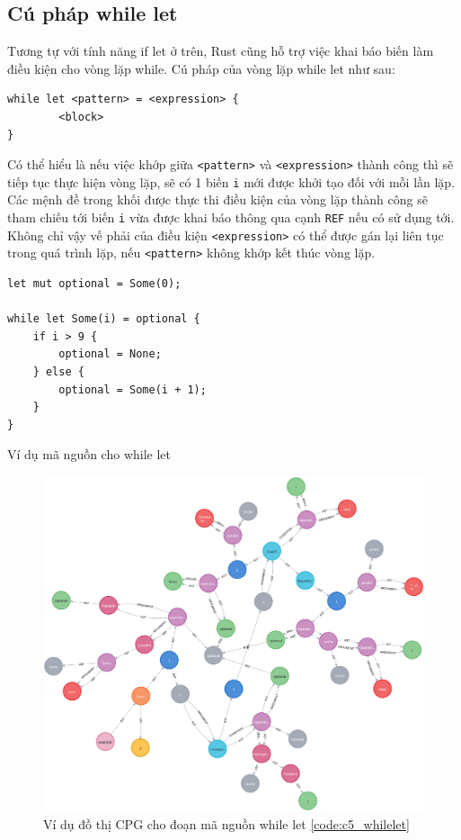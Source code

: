 \subsection{Cú pháp while let}

Tương tự với tính năng if let ở trên, Rust cũng hỗ trợ việc khai báo biến làm điều kiện cho vòng lặp while.
Cú pháp của vòng lặp while let như sau:

\begin{verbatim}
while let <pattern> = <expression> {
        <block>
}
\end{verbatim}

Có thể hiểu là nếu việc khớp giữa \texttt{<pattern>} và \texttt{<expression>} thành công thì sẽ tiếp tục thực hiện vòng lặp, sẽ có 1 biến \texttt{i} mới được khởi tạo đối với mỗi lần lặp.
Các mệnh đề trong khối được thực thi điều kiện của vòng lặp thành công sẽ tham chiếu tới biến \texttt{i} vừa được khai báo thông qua cạnh \texttt{REF} nếu có sử dụng tới.
Không chỉ vậy vế phải của điều kiện \texttt{<expression>} có thể được gán lại liên tục trong quá trình lặp, nếu \texttt{<pattern>} không khớp kết thúc vòng lặp.

\begin{listing}[H]
\begin{verbatim}
let mut optional = Some(0);

while let Some(i) = optional {
    if i > 9 {
        optional = None;
    } else {
        optional = Some(i + 1);
    }
}
\end{verbatim}
\caption{Ví dụ mã nguồn cho while let}
\label{code:c5_whilelet}
\end{listing}

\begin{figure}[H]
    \includegraphics[width=1\columnwidth]{figures/c5/c5_whilelet.png}
    \centering
    \caption{Ví dụ đồ thị CPG cho đoạn mã nguồn while let \ref{code:c5_whilelet}}
    \label{img:c5_cpg_whilelet}
\end{figure}

